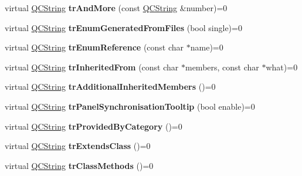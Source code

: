\begin{DoxyCompactItemize}
\item 
\mbox{\label{class_translator_abd4b544ad269cb9d961884cd00f14fca}} 
virtual \mbox{\hyperlink{class_q_c_string}{Q\+C\+String}} {\bfseries tr\+And\+More} (const \mbox{\hyperlink{class_q_c_string}{Q\+C\+String}} \&number)=0
\item 
\mbox{\label{class_translator_af21afaff7590eb294ec7fb3b18029909}} 
virtual \mbox{\hyperlink{class_q_c_string}{Q\+C\+String}} {\bfseries tr\+Enum\+Generated\+From\+Files} (bool single)=0
\item 
\mbox{\label{class_translator_a3fa7986dfef5b01e44a251f25ead984b}} 
virtual \mbox{\hyperlink{class_q_c_string}{Q\+C\+String}} {\bfseries tr\+Enum\+Reference} (const char $\ast$name)=0
\item 
\mbox{\label{class_translator_a05c65c0de6c0907704280945e9af8f21}} 
virtual \mbox{\hyperlink{class_q_c_string}{Q\+C\+String}} {\bfseries tr\+Inherited\+From} (const char $\ast$members, const char $\ast$what)=0
\item 
\mbox{\label{class_translator_aa08d0eb2be4b26dcd40f9984c89201cf}} 
virtual \mbox{\hyperlink{class_q_c_string}{Q\+C\+String}} {\bfseries tr\+Additional\+Inherited\+Members} ()=0
\item 
\mbox{\label{class_translator_ac02207b116aa38a252f1f192e320fafe}} 
virtual \mbox{\hyperlink{class_q_c_string}{Q\+C\+String}} {\bfseries tr\+Panel\+Synchronisation\+Tooltip} (bool enable)=0
\item 
\mbox{\label{class_translator_a30fce1c46473ab0238add58ddc68355e}} 
virtual \mbox{\hyperlink{class_q_c_string}{Q\+C\+String}} {\bfseries tr\+Provided\+By\+Category} ()=0
\item 
\mbox{\label{class_translator_a49a3a1c8b254d7586c30f86034607563}} 
virtual \mbox{\hyperlink{class_q_c_string}{Q\+C\+String}} {\bfseries tr\+Extends\+Class} ()=0
\item 
\mbox{\label{class_translator_a666db44cbf3d6b05822b996aaec11a6b}} 
virtual \mbox{\hyperlink{class_q_c_string}{Q\+C\+String}} {\bfseries tr\+Class\+Methods} ()=0

\end{DoxyCompactItemize}
